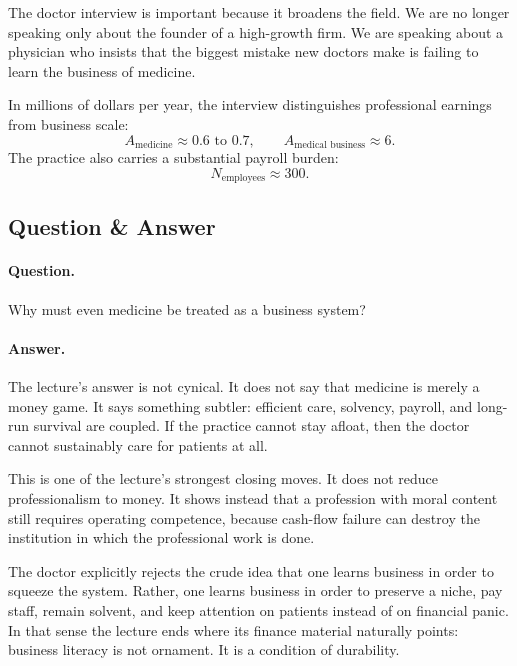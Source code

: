 The doctor interview is important because it broadens the field. We are no longer speaking only about the founder of a high-growth firm. We are speaking about a physician who insists that the biggest mistake new doctors make is failing to learn the business of medicine.

In millions of dollars per year, the interview distinguishes professional earnings from business scale:
\begin{equation}
A_{\text{medicine}} \approx 0.6 \text{ to } 0.7,\qquad A_{\text{medical business}} \approx 6.
\end{equation}
The practice also carries a substantial payroll burden:
\begin{equation}
N_{\text{employees}} \approx 300.
\end{equation}

\subsection{Question \& Answer}

\paragraph{Question.} Why must even medicine be treated as a business system?

\paragraph{Answer.} The lecture's answer is not cynical. It does not say that medicine is merely a money game. It says something subtler: efficient care, solvency, payroll, and long-run survival are coupled. If the practice cannot stay afloat, then the doctor cannot sustainably care for patients at all.

\begin{remark}
This is one of the lecture's strongest closing moves. It does not reduce professionalism to money. It shows instead that a profession with moral content still requires operating competence, because cash-flow failure can destroy the institution in which the professional work is done.
\end{remark}

The doctor explicitly rejects the crude idea that one learns business in order to squeeze the system. Rather, one learns business in order to preserve a niche, pay staff, remain solvent, and keep attention on patients instead of on financial panic. In that sense the lecture ends where its finance material naturally points: business literacy is not ornament. It is a condition of durability.

